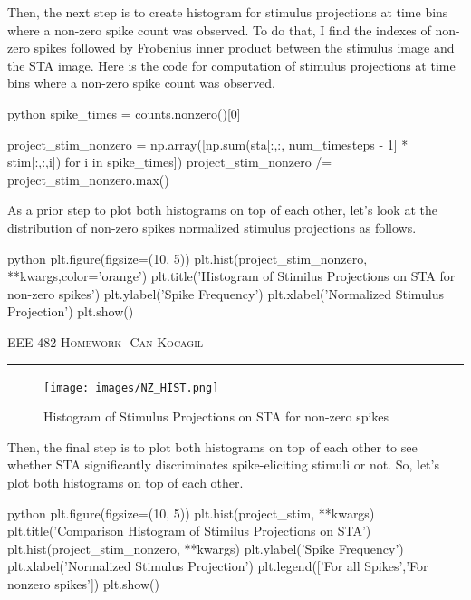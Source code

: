 \documentclass[12pt]{amsart}
\begin{document}
Then, the next step is to create histogram for stimulus projections at time bins where a non-zero spike count was observed. To do that, I find the indexes of non-zero spikes followed by Frobenius inner product between the stimulus image and the STA image. Here is the code for computation of stimulus projections at time bins where a non-zero spike count was observed.

\begin{mintedbox}{python}
spike_times = counts.nonzero()[0]

project_stim_nonzero = np.array([np.sum(sta[:,:, num_timesteps - 1] * stim[:,:,i]) for i in spike_times]) 
project_stim_nonzero /= project_stim_nonzero.max()
\end{mintedbox}

As a prior step to plot both histograms on top of each other, let's look at the distribution of non-zero spikes normalized stimulus projections as follows.

\begin{mintedbox}{python}
plt.figure(figsize=(10, 5))
plt.hist(project_stim_nonzero, **kwargs,color='orange')
plt.title('Histogram of Stimilus Projections on STA for non-zero spikes')
plt.ylabel('Spike Frequency')
plt.xlabel('Normalized Stimulus Projection')
plt.show()
\end{mintedbox}


\newpage
{\scshape EEE 482} \hfill {\scshape \large  Homework-\relax} \hfill {\scshape Can Kocagil}
\smallskip
\hrule
\vspace{2mm}

\begin{figure}[h]
    \centering
    \texttt{[image: images/NZ\_HİST.png]}
    \caption{Histogram of Stimulus Projections on STA for non-zero spikes}
\end{figure}


Then, the final step is to plot both histograms on top of each other to see whether STA significantly discriminates spike-eliciting stimuli or not. So, let's plot both histograms on top of each other.


\begin{mintedbox}{python}
plt.figure(figsize=(10, 5))
plt.hist(project_stim, **kwargs)
plt.title('Comparison Histogram of Stimilus Projections on STA')
plt.hist(project_stim_nonzero, **kwargs)
plt.ylabel('Spike Frequency')
plt.xlabel('Normalized Stimulus Projection')
plt.legend(['For all Spikes','For nonzero spikes'])
plt.show()
\end{mintedbox}
\end{document}
